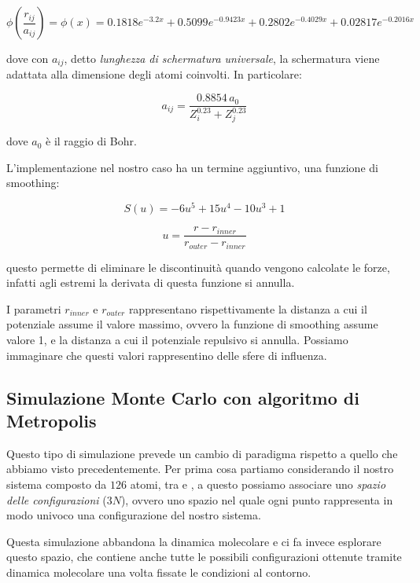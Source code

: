 \documentclass[a4paper,11pt,openany]{book}
\begin{document}
\begin{equation}
    \phi\left(\frac{r_{ij}}{a_{ij}}\right) = \phi(x) = 0.1818e^{-3.2x} + 0.5099e^{-0.9423x} + 0.2802e^{-0.4029x} + 0.02817e^{-0.2016x}
\end{equation}

dove con $a_{ij}$, detto \textit{lunghezza di schermatura universale}, la schermatura viene adattata alla dimensione degli atomi coinvolti. In particolare:

\begin{equation}
    a_{ij} = \frac{0.8854\, a_0}{Z_i^{0.23} + Z_j^{0.23}}
\end{equation}

dove $a_0$ è il raggio di Bohr.

L'implementazione nel nostro caso ha un termine aggiuntivo, una funzione di smoothing: 

\begin{equation}
    S(u) = -6u^5 + 15u^4 - 10u^3 +1
\end{equation}

\begin{equation}
    u = \frac{r-r_{inner}}{r_{outer}-r_{inner}}
\end{equation}

questo permette di eliminare le discontinuità quando vengono calcolate le forze, infatti agli estremi la derivata di questa funzione si annulla.

I parametri $r_{inner}$ e $r_{outer}$ rappresentano rispettivamente la distanza a cui il potenziale assume il valore massimo, ovvero la funzione di smoothing assume valore 1, e la distanza a cui il potenziale repulsivo si annulla. Possiamo immaginare che questi valori rappresentino delle sfere di influenza.

\subsection{Simulazione Monte Carlo con algoritmo di Metropolis}
\label{subsec:simulazione-metropolis-teoria}

Questo tipo di simulazione prevede un cambio di paradigma rispetto a quello che abbiamo visto precedentemente.
Per prima cosa partiamo considerando il nostro sistema composto da $126$ atomi, tra  e , a questo possiamo associare uno \textit{spazio delle configurazioni} ($3N$), ovvero uno spazio nel quale ogni punto rappresenta in modo univoco una configurazione del nostro sistema. 

Questa simulazione abbandona la dinamica molecolare e ci fa invece esplorare questo spazio, che contiene anche tutte le possibili configurazioni ottenute tramite dinamica molecolare una volta fissate le condizioni al contorno.
\end{document}

